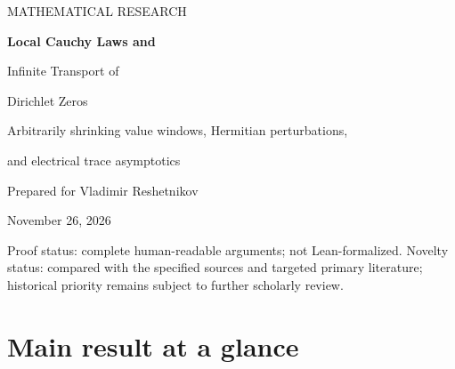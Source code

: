 \documentclass[11pt,letterpaper]{article}
\theoremstyle{remark}
\numberwithin{equation}{section}
\begin{document}
\begin{titlepage}
\vspace*{0.7in}
{\color{teal}\sffamily\large MATHEMATICAL RESEARCH\par}
\vspace{0.2in}
{\color{navy}\huge\bfseries Local Cauchy Laws and\par
Infinite Transport of\par Dirichlet Zeros\par}
\vspace{0.25in}
{\Large Arbitrarily shrinking value windows, Hermitian perturbations,\par
and electrical trace asymptotics\par}
\vspace{0.35in}
{\large Prepared for Vladimir Reshetnikov\par}
{November 26, 2026\par}
\vspace{0.35in}
\begin{abstract}
Starting from the proved zero-location theorem for Dirichlet $L$-functions
and an earlier graph-coupled-zero construction, we derive three related
extensions.  First, if $F$ is a phase-real completed primitive Dirichlet
function and $t$ is uniform on $[T,2T]$, the normalized logarithmic
derivative $2F'(t)/(F(t)\log T)$ satisfies a local Cauchy law for every
moving interval shrinking to a finite point, with no lower bound on its
width.  Second, for Hermitian $A$ and $B\succeq0$, the canonical zero
transport density of $\det(\operatorname{diag}(F_i)A+
\operatorname{diag}(F_i'))$ obeys
$(\log T)\sigma(Tu)du\to(2\operatorname{tr}B/\pi)du$.
We give an exact Poisson regularization and every term of its logarithmic
asymptotic expansion.  Third, a squared-ordinate construction has
accumulated transport asymptotic to
$\Delta K\sqrt X\log X/(4\pi n)$, where $\Delta K$ is the decrease in the
network's Kirchhoff index.  All multiplicities and shared zeros are
allowed.  Complete proofs, source provenance, exact algebraic checks,
and reproducible numerical diagnostics accompany the report.
\end{abstract}
\vfill
{\small\color{navy}Proof status: complete human-readable arguments;
not Lean-formalized.  Novelty status: compared with the specified sources
and targeted primary literature; historical priority remains subject to
further scholarly review.}
\end{titlepage}

\tableofcontents
\newpage
\section*{Main result at a glance}
\end{document}
